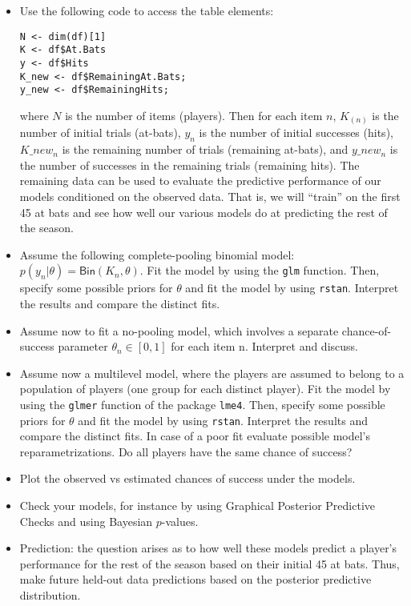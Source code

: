 \begin{itemize}
\item Use the following code to access the table elements:

\begin{verbatim}
N <- dim(df)[1]
K <- df$At.Bats
y <- df$Hits
K_new <- df$RemainingAt.Bats;
y_new <- df$RemainingHits;
\end{verbatim}
where $N$ is the number of items (players). Then for each item $n$, $K_{(n)}$ is the number of initial trials (at-bats), $y_n$ is the number of initial successes (hits), $K\_new_{n}$ is the remaining number of trials (remaining at-bats), and $y\_new_{n}$ is the number of successes in the remaining trials (remaining hits). The remaining data can be used to evaluate the predictive performance of our models conditioned on the observed data. That is, we will “train” on the first 45 at bats and see how well our various models do at predicting the rest of the season.
\item Assume the following complete-pooling binomial model: $p(y_n| \theta)= \mathsf{Bin}(K_n, \theta)$. Fit the model by using the \texttt{glm} function. Then, specify some possible priors for $\theta$ and fit the model by using \texttt{rstan}. Interpret the results and compare the distinct fits.
\item Assume now to fit a no-pooling model, which  involves a separate chance-of-success parameter $\theta_n \in [0,1]$ for each item n. Interpret and discuss.
\item Assume now a multilevel model, where the players are assumed to belong to a population of players (one group for each distinct player). Fit the model by using the \texttt{glmer} function of the package \texttt{lme4}. Then, specify some possible priors for $\theta$ and fit the model by using \texttt{rstan}. Interpret the results and compare the distinct fits. In case of a poor fit evaluate possible model's reparametrizations. Do all players have the same chance of success?
\item Plot the observed vs estimated chances of success under the models.
\item Check your models, for instance by using Graphical Posterior Predictive Checks and using Bayesian $p$-values.
\item Prediction: the question arises as to how well these models predict a player’s performance for the rest of the season based on their initial 45 at bats. Thus, make future held-out data predictions based on the posterior predictive distribution.

\end{itemize}
